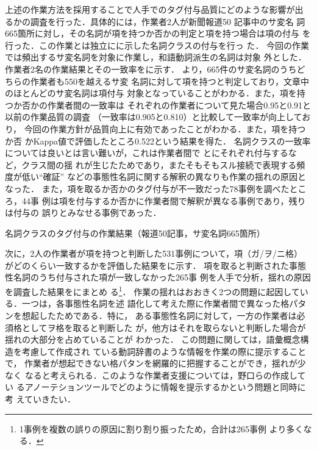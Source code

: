 \documentclass[japanese]{jnlp_1.4}
\def\sec#1{}
\def\tab#1{}
\def\brace#1{}
\begin{document}
上述の作業方法を採用することで人手でのタグ付与品質にどのような影響が出
るかの調査を行った．具体的には，作業者2人が新聞報道50 記事中のサ変名
詞665箇所に対し，その名詞が項を持つか否かの判定と項を持つ場合は項の付与
を行った．この作業とは独立に\sec{third}に示した名詞クラスの付与を行っ
た．
今回の作業では頻出するサ変名詞を対象に作業し，和語動詞派生の名詞は対象
外とした．作業者2名の作業結果とその一致率を\tab{result}に示す．
\tab{result}より，665件のサ変名詞のうちどちらの作業者も550を越えるサ変
名詞に対して項を持つと判定しており，文章中のほとんどのサ変名詞は項付与
対象となっていることがわかる．また，項を持つか否かの作業者間の一致率は
それぞれの作業者について見た場合0.95と0.91と以前の作業品質の調査
\cite{Iida:07}
（一致率は0.905と0.810）と比較して一致率が向上しており，
今回の作業方針が品質向上に有効であったことがわかる．また，項を持つか否
かKappa値で評価したところ0.522という結果を得た．
名詞クラスの一致率については良いとは言い難いが，これは作業者間で
\brace{結果物/内容}と\brace{ずれ}にそれぞれ付与するなど，クラス間の揺
れが生じたためであり，またそもそもスル接続で表現する頻度が低い``確証''
などの事態性名詞に関する解釈の異なりも作業の揺れの原因となった．
また，項を取るか否かのタグ付与が不一致だった78事例を調べたところ，44事
例は項を付与するか否かに作業者間で解釈が異なる事例であり，残りは付与の
誤りとみなせる事例であった．

\begin{table}[b]
  \caption{名詞クラスのタグ付与の作業結果（報道50記事，サ変名詞665箇所）}
  \label{tab:result}

\end{table}


次に，2人の作業者が項を持つと判断した531事例について，項（ガ/ヲ/ニ格）
がどのくらい一致するかを評価した結果を\tab{agree_arg}に示す．
項を取ると判断された事態性名詞のうち付与された項が一致しなかった265事
例を人手で分析，揺れの原因を調査した結果を\tab{inconsistence}にまとめ
る\footnote{1事例を複数の誤りの原因に割り割り振ったため，合計は265事例
  より多くなる．}．
作業の揺れはおおきく2つの問題に起因している．一つは，各事態性名詞を述
語化して考えた際に作業者間で異なった格パタンを想起したためである．特に，
ある事態性名詞に対して，一方の作業者は必須格としてヲ格を取ると判断した
が，他方はそれを取らないと判断した場合が揺れの大部分を占めていることが
わかった．
この問題に関しては，語彙概念構造\cite{Jackendoff:90}を考慮して作成され
ている動詞辞書\cite{Takeuchi:06}のような情報を作業の際に提示することで，
作業者が想起できない格パタンを網羅的に把握することができ，揺れが少なく
なると考えられる．このような作業者支援については，野口らの作成してい
るアノーテションツール\cite{Noguchi:08}でどのように情報を提示するかという問題と同時に考
えていきたい．
\end{document}
